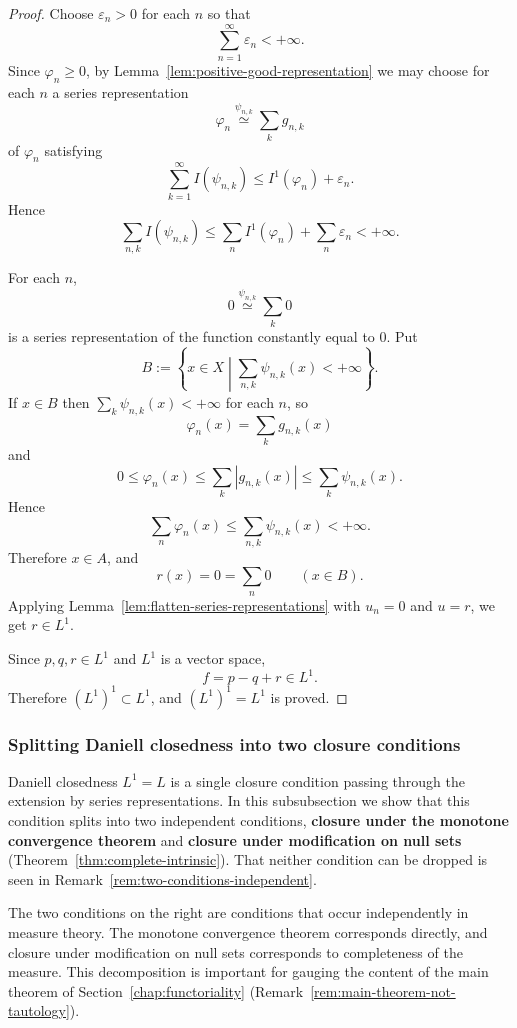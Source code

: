 \begin{proof}
  Choose $\varepsilon_n>0$ for each $n$ so that
  \[
    \sum_{n=1}^\infty\varepsilon_n<+\infty .
  \]
  Since $\varphi_n\ge0$, by Lemma~\ref{lem:positive-good-representation} we may
  choose for each $n$ a series representation
  \[
    \varphi_n\overset{\psi_{n,k}}{\simeq}\sum_k g_{n,k}
  \]
  of $\varphi_n$ satisfying
  \[
    \sum_{k=1}^\infty I(\psi_{n,k})
    \le I^1(\varphi_n)+\varepsilon_n .
  \]
  Hence
  \[
    \sum_{n,k}I(\psi_{n,k})
    \le
    \sum_n I^1(\varphi_n)+\sum_n\varepsilon_n
    <+\infty.
  \]

  For each $n$,
  \[
    0\overset{\psi_{n,k}}{\simeq}\sum_k0
  \]
  is a series representation of the function constantly equal to $0$. Put
  \[
    B:=
    \left\{
      x\in X
      \mathrel{}\middle|\mathrel{}
      \sum_{n,k}\psi_{n,k}(x)<+\infty
    \right\} .
  \]
  If $x\in B$ then $\sum_k\psi_{n,k}(x)<+\infty$ for each $n$, so
  \[
    \varphi_n(x)=\sum_k g_{n,k}(x)
  \]
  and
  \[
    0\le\varphi_n(x)
    \le\sum_k|g_{n,k}(x)|
    \le\sum_k\psi_{n,k}(x).
  \]
  Hence
  \[
    \sum_n\varphi_n(x)
    \le\sum_{n,k}\psi_{n,k}(x)
    <+\infty.
  \]
  Therefore $x\in A$, and
  \[
    r(x)=0=\sum_n0
    \qquad(x\in B).
  \]
  Applying Lemma~\ref{lem:flatten-series-representations} with $u_n=0$ and
  $u=r$, we get $r\in L^1$.

  Since $p,q,r\in L^1$ and $L^1$ is a vector space,
  \[
    f=p-q+r\in L^1 .
  \]
  Therefore $(L^1)^1\subset L^1$, and $(L^1)^1=L^1$ is proved.
\end{proof}

\subsubsection{Splitting Daniell closedness into two closure conditions}

Daniell closedness $L^1=L$ is a single closure condition passing through the
extension by series representations.
In this subsubsection we show that this condition splits into two independent
conditions, \textbf{closure under the monotone convergence theorem} and
\textbf{closure under modification on null sets}
(Theorem~\ref{thm:complete-intrinsic}).
That neither condition can be dropped is seen in
Remark~\ref{rem:two-conditions-independent}.

The two conditions on the right are conditions that occur independently in
measure theory.
The monotone convergence theorem corresponds directly, and closure under
modification on null sets corresponds to completeness of the measure.
This decomposition is important for gauging the content of the main theorem of
Section~\ref{chap:functoriality}
(Remark~\ref{rem:main-theorem-not-tautology}).

